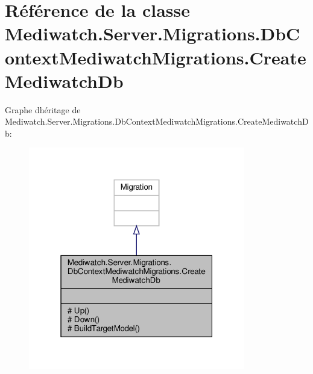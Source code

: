 \hypertarget{class_mediwatch_1_1_server_1_1_migrations_1_1_db_context_mediwatch_migrations_1_1_create_mediwatch_db}{}\section{Référence de la classe Mediwatch.\+Server.\+Migrations.\+Db\+Context\+Mediwatch\+Migrations.\+Create\+Mediwatch\+Db}
\label{class_mediwatch_1_1_server_1_1_migrations_1_1_db_context_mediwatch_migrations_1_1_create_mediwatch_db}


Graphe d\textquotesingle{}héritage de Mediwatch.\+Server.\+Migrations.\+Db\+Context\+Mediwatch\+Migrations.\+Create\+Mediwatch\+Db\+:\nopagebreak
\begin{figure}[H]
\begin{center}
\leavevmode
\includegraphics[width=268pt]{class_mediwatch_1_1_server_1_1_migrations_1_1_db_context_mediwatch_migrations_1_1_create_mediwatch_db__inherit__graph}
\end{center}
\end{figure}


